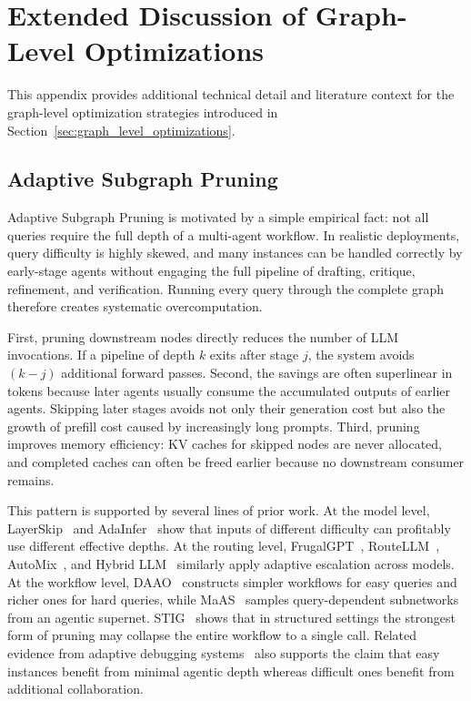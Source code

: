 \section{Extended Discussion of Graph-Level Optimizations}
\label{app:graph_level_optimizations_extended}

This appendix provides additional technical detail and literature context for the graph-level optimization strategies introduced in Section~\ref{sec:graph_level_optimizations}.

\subsection{Adaptive Subgraph Pruning}

Adaptive Subgraph Pruning is motivated by a simple empirical fact: not all queries require the full depth of a multi-agent workflow. In realistic deployments, query difficulty is highly skewed, and many instances can be handled correctly by early-stage agents without engaging the full pipeline of drafting, critique, refinement, and verification. Running every query through the complete graph therefore creates systematic overcomputation.

First, pruning downstream nodes directly reduces the number of LLM invocations. If a pipeline of depth $k$ exits after stage $j$, the system avoids $(k-j)$ additional forward passes. Second, the savings are often superlinear in tokens because later agents usually consume the accumulated outputs of earlier agents. Skipping later stages avoids not only their generation cost but also the growth of prefill cost caused by increasingly long prompts. Third, pruning improves memory efficiency: KV caches for skipped nodes are never allocated, and completed caches can often be freed earlier because no downstream consumer remains.

This pattern is supported by several lines of prior work. At the model level, LayerSkip~\citep{elhoushi2024layerskip} and AdaInfer~\citep{fan2024adainfer} show that inputs of different difficulty can profitably use different effective depths. At the routing level, FrugalGPT~\citep{chen2023frugalgpt}, RouteLLM~\citep{ong2024routellm}, AutoMix~\citep{aggarwal2024automix}, and Hybrid LLM~\citep{ding2024hybridllm} similarly apply adaptive escalation across models. At the workflow level, DAAO~\citep{daao2025} constructs simpler workflows for easy queries and richer ones for hard queries, while MaAS~\citep{zhang2025maas} samples query-dependent subnetworks from an agentic supernet. STIG~\citep{stig2025} shows that in structured settings the strongest form of pruning may collapse the entire workflow to a single call. Related evidence from adaptive debugging systems~\citep{adaptive_debug2025} also supports the claim that easy instances benefit from minimal agentic depth whereas difficult ones benefit from additional collaboration.

